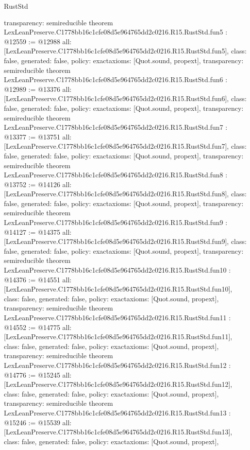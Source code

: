 \begin{lexlean}{RustStd}
\begin{coremodule}
{  transparency: semireducible
}
theorem LexLeanPreserve.C1778bb16c1cfe08d5e964765dd2c0216.R15.RustStd.fun5 : @12559 := @12988 {
  all: [LexLeanPreserve.C1778bb16c1cfe08d5e964765dd2c0216.R15.RustStd.fun5],
  class: false,
  generated: false,
  policy: exact{axioms: [Quot.sound, propext]},
  transparency: semireducible
}
theorem LexLeanPreserve.C1778bb16c1cfe08d5e964765dd2c0216.R15.RustStd.fun6 : @12989 := @13376 {
  all: [LexLeanPreserve.C1778bb16c1cfe08d5e964765dd2c0216.R15.RustStd.fun6],
  class: false,
  generated: false,
  policy: exact{axioms: [Quot.sound, propext]},
  transparency: semireducible
}
theorem LexLeanPreserve.C1778bb16c1cfe08d5e964765dd2c0216.R15.RustStd.fun7 : @13377 := @13751 {
  all: [LexLeanPreserve.C1778bb16c1cfe08d5e964765dd2c0216.R15.RustStd.fun7],
  class: false,
  generated: false,
  policy: exact{axioms: [Quot.sound, propext]},
  transparency: semireducible
}
theorem LexLeanPreserve.C1778bb16c1cfe08d5e964765dd2c0216.R15.RustStd.fun8 : @13752 := @14126 {
  all: [LexLeanPreserve.C1778bb16c1cfe08d5e964765dd2c0216.R15.RustStd.fun8],
  class: false,
  generated: false,
  policy: exact{axioms: [Quot.sound, propext]},
  transparency: semireducible
}
theorem LexLeanPreserve.C1778bb16c1cfe08d5e964765dd2c0216.R15.RustStd.fun9 : @14127 := @14375 {
  all: [LexLeanPreserve.C1778bb16c1cfe08d5e964765dd2c0216.R15.RustStd.fun9],
  class: false,
  generated: false,
  policy: exact{axioms: [Quot.sound, propext]},
  transparency: semireducible
}
theorem LexLeanPreserve.C1778bb16c1cfe08d5e964765dd2c0216.R15.RustStd.fun10 : @14376 := @14551 {
  all: [LexLeanPreserve.C1778bb16c1cfe08d5e964765dd2c0216.R15.RustStd.fun10],
  class: false,
  generated: false,
  policy: exact{axioms: [Quot.sound, propext]},
  transparency: semireducible
}
theorem LexLeanPreserve.C1778bb16c1cfe08d5e964765dd2c0216.R15.RustStd.fun11 : @14552 := @14775 {
  all: [LexLeanPreserve.C1778bb16c1cfe08d5e964765dd2c0216.R15.RustStd.fun11],
  class: false,
  generated: false,
  policy: exact{axioms: [Quot.sound, propext]},
  transparency: semireducible
}
theorem LexLeanPreserve.C1778bb16c1cfe08d5e964765dd2c0216.R15.RustStd.fun12 : @14776 := @15245 {
  all: [LexLeanPreserve.C1778bb16c1cfe08d5e964765dd2c0216.R15.RustStd.fun12],
  class: false,
  generated: false,
  policy: exact{axioms: [Quot.sound, propext]},
  transparency: semireducible
}
theorem LexLeanPreserve.C1778bb16c1cfe08d5e964765dd2c0216.R15.RustStd.fun13 : @15246 := @15539 {
  all: [LexLeanPreserve.C1778bb16c1cfe08d5e964765dd2c0216.R15.RustStd.fun13],
  class: false,
  generated: false,
  policy: exact{axioms: [Quot.sound, propext]},
}
\end{coremodule}
\end{lexlean}
